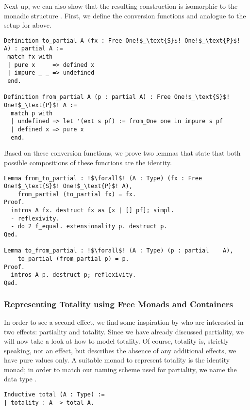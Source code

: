 Next up, we can also show that the resulting construction   is isomorphic to the monadic structure .
First, we define the conversion functions  and  analogue to the setup for  above.

\begin{verbatim}
Definition to_partial A (fx : Free One!$_\text{S}$! One!$_\text{P}$! A) : partial A :=
 match fx with
 | pure x     => defined x
 | impure _ _ => undefined
 end.

Definition from_partial A (p : partial A) : Free One!$_\text{S}$! One!$_\text{P}$! A :=
  match p with
  | undefined => let '(ext s pf) := from_One one in impure s pf
  | defined x => pure x
  end.
\end{verbatim}

Based on these conversion functions, we prove two lemmas that state that both possible compositions of these functions are the identity.

\begin{verbatim}
Lemma from_to_partial : !$\forall$! (A : Type) (fx : Free One!$_\text{S}$! One!$_\text{P}$! A),
    from_partial (to_partial fx) = fx.
Proof.
  intros A fx. destruct fx as [x | [] pf]; simpl.
  - reflexivity.
  - do 2 f_equal. extensionality p. destruct p.
Qed.

Lemma to_from_partial : !$\forall$! (A : Type) (p : partial    A),
    to_partial (from_partial p) = p.
Proof.
  intros A p. destruct p; reflexivity.
Qed.
\end{verbatim}

\subsubsection{Representing Totality using Free Monads and Containers}
\label{subsub:totality_container}
In order to see a second effect, we find some inspiration by \citet{abel2005verifying} who are interested in two effects: partiality and totality.
Since we have already discussed partiality, we will now take a look at how to model totality.
Of course, totality is, strictly speaking, not an effect, but describes the absence of any additional effects, we have pure values only.
A suitable monad to represent totality is the identity monad; in order to match our naming scheme used for partiality, we name the data type .

\begin{verbatim}
Inductive total (A : Type) :=
| totality : A -> total A.
\end{verbatim}

